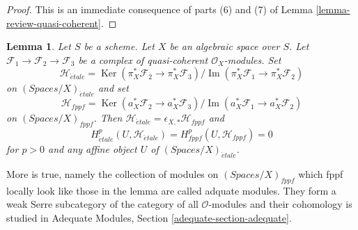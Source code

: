 \documentclass{stacks-project}
\theoremstyle{plain}
\newtheorem{lemma}[subsection]{Lemma}
\theoremstyle{definition}
\theoremstyle{remark}
\numberwithin{equation}{subsection}
\def\etale{{\acute{e}tale}}
\def\Ker{\mathop{\mathrm{Ker}}}
\def\Im{\mathop{\mathrm{Im}}}
\begin{document}
\begin{proof}
This is an immediate consequence of parts (6) and (7) of
Lemma \ref{lemma-review-quasi-coherent}.
\end{proof}

\begin{lemma}
\label{lemma-vanishing-adequate}
Let $S$ be a scheme. Let $X$ be an algebraic space over $S$.
Let $\mathcal{F}_1 \to \mathcal{F}_2 \to \mathcal{F}_3$
be a complex of quasi-coherent $\mathcal{O}_X$-modules.
Set
$$
\mathcal{H}_\etale =
\Ker(\pi_X^*\mathcal{F}_2 \to \pi_X^*\mathcal{F}_3)/
\Im(\pi_X^*\mathcal{F}_1 \to \pi_X^*\mathcal{F}_2)
$$
on $(\textit{Spaces}/X)_\etale$ and set
$$
\mathcal{H}_{fppf} =
\Ker(a_X^*\mathcal{F}_2 \to a_X^*\mathcal{F}_3)/
\Im(a_X^*\mathcal{F}_1 \to a_X^*\mathcal{F}_2)
$$
on $(\textit{Spaces}/X)_{fppf}$.
Then $\mathcal{H}_\etale = \epsilon_{X, *}\mathcal{H}_{fppf}$
and
$$
H^p_\etale(U, \mathcal{H}_\etale) = H^p_{fppf}(U, \mathcal{H}_{fppf}) = 0
$$
for $p > 0$ and any affine object $U$ of $(\textit{Spaces}/X)_\etale$.
\end{lemma}

\noindent
More is true, namely the collection of modules on
$(\textit{Spaces}/X)_{fppf}$ which fppf locally look like those
in the lemma are called adquate modules. They form a
weak Serre subcategory of the category of all $\mathcal{O}$-modules
and their cohomology is studied in
Adequate Modules, Section \ref{adequate-section-adequate}.
\end{document}
